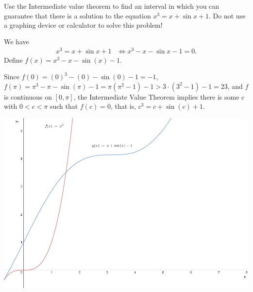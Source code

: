 \documentclass[nooutcomes,handout]{ximera}
\begin{document}
\begin{problem}
  Use the Intermediate value theorem to find an interval in which you can guarantee that there is a solution to the equation $x^3 = x + \sin x + 1$.
  Do not use a graphing device or calculator to solve this problem!
  \begin{freeResponse}
    We have
    \begin{align*}
      x^3 = x + \sin x + 1 &\iff x^3 - x - \sin x - 1 = 0.
    \end{align*}
  Define $f(x) =  x^3 - x - \sin(x) - 1$.

    Since $f(0) = (0)^3 - (0) - \sin(0)-1 = -1$,  $f(\pi) = \pi^3 - \pi - \sin(\pi)-1 = \pi(\pi^2 - 1) - 1 > 3 \cdot (3^2 - 1) - 1 = 23$, and $f$ is continuous on $[0, \pi]$, the Intermediate Value Theorem implies there is some $c$ with $0 < c < \pi$ such that $f(c) = 0$, that is, $c^3 = c + \sin (c) + 1$.

	\begin{image}
	\includegraphics[scale=.5]{Figure3.png}
	\end{image}


  \end{freeResponse}
\end{problem}
	
\end{document}
